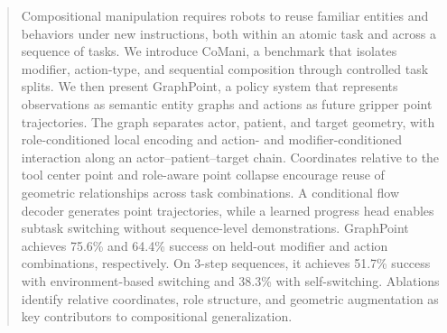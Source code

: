 \begin{abstract}
Compositional manipulation requires robots to reuse familiar entities and behaviors under new instructions, both within an atomic task and across a sequence of tasks.
We introduce CoMani, a benchmark that isolates modifier, action-type, and sequential composition through controlled task splits.
We then present GraphPoint, a policy system that represents observations as semantic entity graphs and actions as future gripper point trajectories.
The graph separates actor, patient, and target geometry, with role-conditioned local encoding and action- and modifier-conditioned interaction along an actor--patient--target chain.
Coordinates relative to the tool center point and role-aware point collapse encourage reuse of geometric relationships across task combinations.
A conditional flow decoder generates point trajectories, while a learned progress head enables subtask switching without sequence-level demonstrations.
GraphPoint achieves 75.6\% and 64.4\% success on held-out modifier and action combinations, respectively.
On 3-step sequences, it achieves 51.7\% success with environment-based switching and 38.3\% with self-switching.
Ablations identify relative coordinates, role structure, and geometric augmentation as key contributors to compositional generalization.
\end{abstract}
